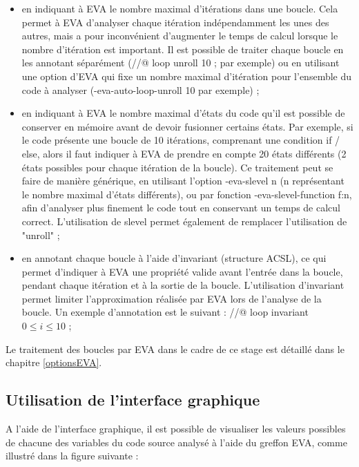 \begin{itemize}
	\item en indiquant à EVA le nombre maximal d'itérations dans une boucle. Cela permet à EVA d'analyser chaque itération indépendamment les unes des autres, mais a pour inconvénient d'augmenter le temps de calcul lorsque le nombre d'itération est important. Il est possible de traiter chaque boucle en les annotant séparément (//@ loop unroll 10 ;  par exemple) ou en utilisant une option d'EVA qui fixe un nombre maximal d'itération pour l'ensemble du code à analyser (-eva-auto-loop-unroll 10 par exemple) ;
	\item en indiquant à EVA le nombre maximal d'états du code qu'il est possible de conserver en mémoire avant de devoir fusionner certains états. Par exemple, si le code présente une boucle de 10 itérations, comprenant une condition if / else, alors il faut indiquer à EVA de prendre en compte 20 états différents (2 états possibles pour chaque itération de la boucle). Ce traitement peut se faire de manière générique, en utilisant l'option -eva-slevel n (n représentant le nombre maximal d'états différents), ou par fonction -eva-slevel-function f:n, afin d'analyser plus finement le code tout en conservant un temps de calcul correct. L'utilisation de slevel permet également de remplacer l'utilisation de "unroll" ;
	\item en annotant chaque boucle à l'aide d'invariant (structure ACSL), ce qui permet d'indiquer à EVA une propriété valide avant l'entrée dans la boucle, pendant chaque itération et à la sortie de la boucle. L'utilisation d'invariant permet limiter l'approximation réalisée par EVA lors de l'analyse de la boucle. Un exemple d'annotation est le suivant :  //@ loop invariant  $ 0 \leq i \leq 10 $ ;
\end{itemize}

Le traitement des boucles par EVA dans le cadre de ce stage est détaillé dans le chapitre \ref{optionsEVA}.

\subsection{Utilisation de l'interface graphique}

A l'aide de l'interface graphique, il est possible de visualiser les valeurs possibles de chacune des variables du code source analysé à l'aide du greffon EVA, comme illustré dans la figure suivante :

